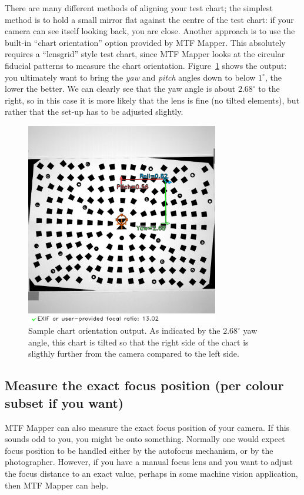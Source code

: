 \documentclass[a4paper]{article}
\begin{document}
There are many different methods of aligning your test chart; the simplest
method is to hold a small mirror flat against the centre of the test chart: if your camera
can see itself looking back, you are close. Another approach is to use the
built-in ``chart orientation'' option provided by MTF Mapper. This
absolutely requires a ``lensgrid'' style test chart, since MTF Mapper looks
at the circular fiducial patterns to measure the chart orientation.
Figure~\ref{fig:chart_orientation_example} shows the output: you ultimately
want to bring the \emph{yaw} and \emph{pitch} angles down to below
$1^\circ$, the lower the better. We can clearly see that the yaw angle is
about $2.68^\circ$ to the right, so in this case it is more likely that the
lens is fine (no tilted elements), but rather that the set-up has to be
adjusted slightly.

\begin{figure}[!ht]
\centering
\includegraphics[width=0.75\textwidth]{figures/orientation_example}
\caption{Sample chart orientation output. As indicated by the $2.68^\circ$
yaw angle, this chart is tilted so that the right side of the chart is sligthly further
from the camera compared to the left side.}
\label{fig:chart_orientation_example}
\end{figure}

\newpage

\subsection{Measure the exact focus position (per colour subset if you want)}
\label{sec:focus_distance}
MTF Mapper can also measure the exact focus position of your camera. If this
sounds odd to you, you might be onto something. Normally one would expect focus
position to be handled either by the autofocus mechanism, or by the
photographer. However, if you have a manual focus lens and you want to
adjust the focus distance to an exact value, perhaps in some machine vision
application, then MTF Mapper can help. 
\end{document}
